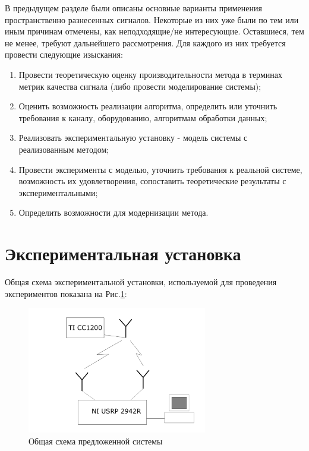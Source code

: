 \documentclass[a4paper,12pt,oneside, abstract=true]{scrartcl}
\begin{document}
В предыдущем разделе были описаны основные варианты применения пространственно разнесенных сигналов. Некоторые из них уже были по тем или иным причинам отмечены, как неподходящие/не интересующие. Оставшиеся, тем не менее, требуют дальнейшего рассмотрения. 
Для каждого из них требуется провести следующие изыскания:
\begin{enumerate}
\item Провести теоретическую оценку производительности метода в терминах метрик качества сигнала (либо провести моделирование системы);
\item Оценить возможность реализации алгоритма, определить или уточнить требования к каналу, оборудованию, алгоритмам обработки данных;
\item Реализовать экспериментальную установку - модель системы с реализованным методом;
\item Провести эксперименты с моделью, уточнить требования к реальной системе, возможность их удовлетворения, сопоставить теоретические результаты с экспериментальными;
\item Определить возможности для модернизации метода.
\end{enumerate}

\clearpage

\section{Экспериментальная установка}
Общая схема экспериментальной установки, используемой для проведения экспериментов показана на Рис.\ref{fig:SystStructure}:

\begin{figure}[!htb]
    \centering
    \includegraphics[width=0.7\textwidth]{pics/systemstructure.png}
    \caption{Общая схема предложенной системы}
    \label{fig:SystStructure}
\end{figure}
\end{document}
